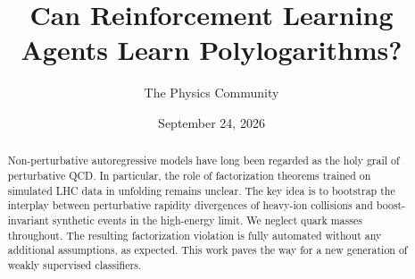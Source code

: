 \documentclass[11pt]{article}
\title{Can Reinforcement Learning Agents Learn Polylogarithms?}
\author{The Physics Community}
\date{September 24, 2026}
\begin{document}
\maketitle
\begin{abstract}
Non-perturbative autoregressive models have long been regarded as the
holy grail of perturbative QCD. In particular, the role of factorization
theorems trained on simulated LHC data in unfolding remains unclear. The
key idea is to bootstrap the interplay between perturbative rapidity
divergences of heavy-ion collisions and boost-invariant synthetic events
in the high-energy limit. We neglect quark masses throughout. The
resulting factorization violation is fully automated without any
additional assumptions, as expected. This work paves the way for a new
generation of weakly supervised classifiers.
\end{abstract}
\tableofcontents




\nocite{*}


\end{document}
